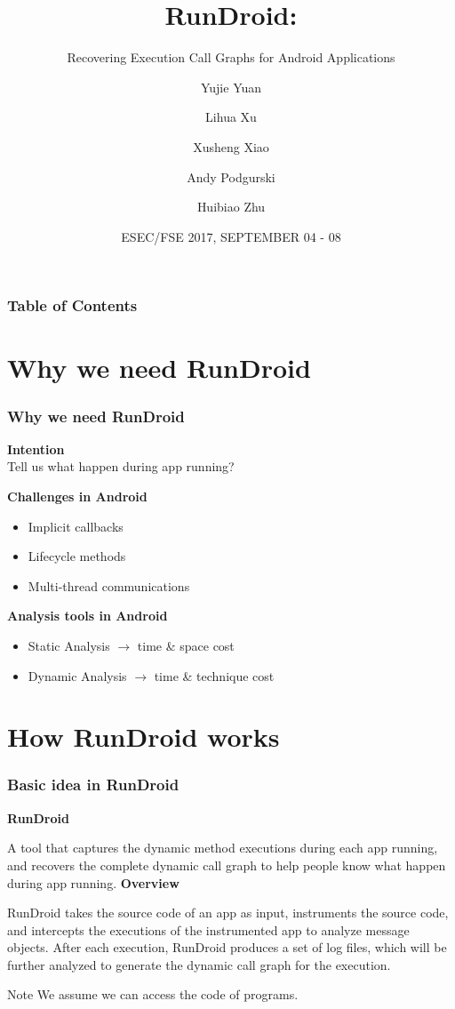 \documentclass{beamer}
\title[RunDroid: Recovering  CGs for Android Apps.]{RunDroid:}
\subtitle{Recovering Execution Call Graphs for Android Applications}
\author[Y. Yuan, L. Xu, X. Xiao, A. Podgursk, H. Zhu] %
{Yujie Yuan\inst{1} \and Lihua Xu \inst{1} \and Xusheng Xiao\inst{2} \\  \and Andy Podgurski\inst{2} \and Huibiao Zhu\inst{1}}
\institute[ECNU,CWRU] %
{
	\inst{1}%
	East China Normal University, China
	\and
	\inst{2}%
	Case Western Reserve University, USA
}
\date[ESEC/FSE 2017]
{ESEC/FSE 2017, SEPTEMBER 04 - 08}
\begin{document}
 \frame{\titlepage}
 
 \begin{frame}
 \frametitle{Table of Contents}
 \tableofcontents
\end{frame}

\section{ Why we need RunDroid}
\begin{frame}
\frametitle{Why we need RunDroid}
\textbf{Intention}\\
Tell us what happen during app running?

\textbf{Challenges in Android}
\begin{itemize}
\item Implicit callbacks
\item Lifecycle methods
\item Multi-thread communications
\end{itemize}
\textbf{Analysis tools in Android}
\begin{itemize}
	\item Static Analysis $\longrightarrow$ time \& space cost
	\item Dynamic Analysis $\longrightarrow$ time \& technique cost
\end{itemize}
\end{frame}

\section{How RunDroid works}
\begin{frame}
\frametitle{Basic idea in RunDroid}

\textbf{RunDroid}


A tool that captures the dynamic method executions during each app running, and recovers the complete dynamic call graph to help people know what happen during app running.
\newline
\newline
\textbf{Overview}

RunDroid takes the source code of an app as input, instruments the source code, and intercepts the executions of the instrumented app to analyze message objects. After each execution, RunDroid produces a set of log files, which will be further analyzed to generate the dynamic call graph for the execution.
\newline

\begin{alertblock}{Note}
We assume we can access the code of programs.
\end{alertblock}
\end{frame}
\end{document}

